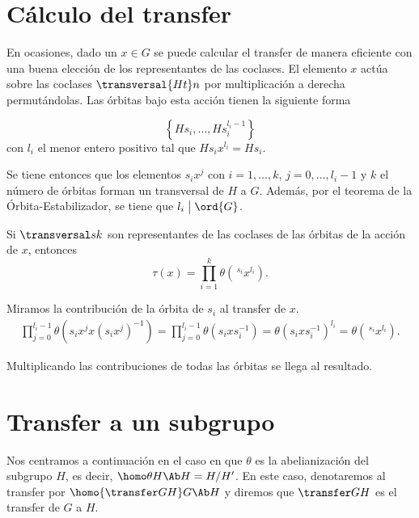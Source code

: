 \section{Cálculo del transfer}

En ocasiones, dado un $x\in G$ se puede calcular el transfer de manera eficiente con una buena elección de los representantes de las coclases. El elemento $x$ actúa sobre las coclases $\transversal {Ht} n$ por multiplicación a derecha permutándolas. Las órbitas bajo esta acción tienen la siguiente forma

\begin{equation}
	\left\{Hs_i,\ldots,Hs_i^{l_i-1}\right\}
\end{equation}
con $l_i$ el menor entero positivo tal que $Hs_ix^{l_i} = Hs_i$.

Se tiene entonces que los elementos $s_ix^j$ con $i=1,\ldots,k$, $j=0,\ldots,l_i-1$ y $k$ el número de órbitas forman un transversal de $H$ a $G$. Además, por el teorema de la Órbita-Estabilizador, se tiene que $l_i \bigm| \ord{G}$.

\begin{lema}
	Si $\transversal s k$ son representantes de las coclases de las órbitas de la acción de $x$, entonces
	\begin{equation}
		 \tau(x) = \prod_{i=1}^k \theta(\,^{s_i}x^{l_i}).
	\end{equation}
	\begin{demostracion}
		Miramos la contribución de la órbita de $s_i$ al transfer de $x$.
		\begin{align*}
			\prod_{j=0}^{l_i-1}\theta(s_ix^j x (s_ix^j)^{-1}) = \prod_{j=0}^{l_i-1}\theta(s_ixs_i^{-1}) = \theta(s_ixs_i^{-1})^{l_i} = \theta(\,^{s_i}x^{l_i}).
		\end{align*}
		
		Multiplicando las contribuciones de todas las órbitas se llega al resultado.
	\end{demostracion}
\end{lema}

\section{Transfer a un subgrupo}

Nos centramos a continuación en el caso en que $\theta$ es la abelianización del subgrupo $H$, es decir, $\homo \theta H {\Ab H} = H/H'$. En este caso, denotaremos al transfer por $\homo {\transfer G H} G {\Ab H}$ y diremos que $\transfer G H$ es el transfer de $G$ a $H$.


